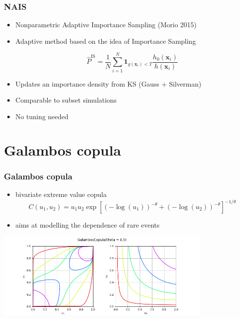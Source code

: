 \documentclass{beamer}
\begin{document}
\begin{frame}[containsverbatim]
\frametitle{NAIS}

\begin{itemize}
\item Nonparametric Adaptive Importance Sampling (Morio 2015)

\item Adaptive method based on the idea of Importance Sampling

$$
\widehat{P}^\text{IS}=\frac{1}{N} \sum_{i=1}^{N} {\mathbf{1}}_{g(\mathbf{x}_i)<T} \frac{h_0(\mathbf{x}_i)}{h(\mathbf{x}_i)}
$$

\item Updates an importance density from KS (Gauss + Silverman)

\item Comparable to subset simulations

\item No tuning needed
\end{itemize}


\end{frame}



\section{Galambos copula}


\begin{frame}
\frametitle{Galambos copula}

\begin{itemize}
\item bivariate extreme value copula
$$ C(u_1, u_2) = u_1u_2\exp\left[(-\log(u_1))^{-\theta} + (-\log(u_2))^{-\theta}\right]^{-1/\theta} $$
\item aims at modelling the dependence of rare events
\end{itemize}

\begin{center}
\includegraphics[width=0.8\textwidth]{figures/openturns-GalambosCopula-1.png}
\end{center}

\end{frame}
\end{document}
